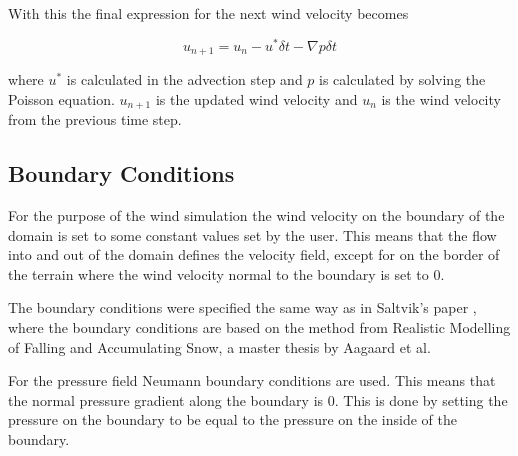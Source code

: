 With this the final expression for the next wind velocity becomes

$$ u_{n+1} = u_n - u^* \delta t - \nabla p \delta t $$

where $u^*$ is calculated in the advection step and $p$ is calculated by solving
the Poisson equation. $u_{n+1}$ is the updated wind velocity and $u_n$ is the
wind velocity from the previous time step.

\subsection{Boundary Conditions}

For the purpose of the wind simulation the wind velocity on the boundary of the
domain is set to some constant values set by the user. This means that the flow
into and out of the domain defines the velocity field, except for on the border
of the terrain where the wind velocity normal to the boundary is set to 0.

The boundary conditions were specified the same way as in Saltvik's paper
\cite{originalSnowThesis}, where the boundary conditions are based 
on the method from Realistic Modelling of Falling and Accumulating Snow, a master
thesis by Aagaard et al\cite{danishSnowThesis}. 

For the pressure field Neumann boundary conditions are used. This means that
the normal pressure gradient along the boundary is 0. This is done by setting
the pressure on the boundary to be equal to the pressure on the inside of the 
boundary.
